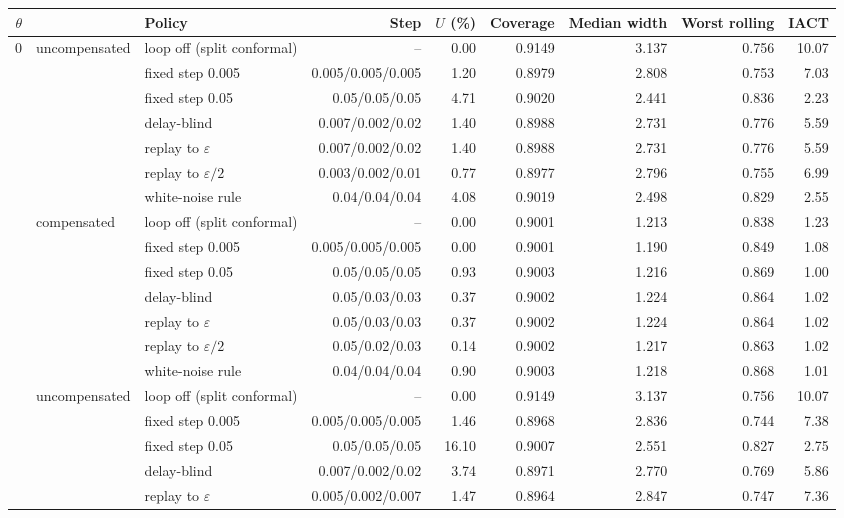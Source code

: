 \begin{tabular}{@{}rllrrrrrr@{}}
\toprule
$\theta$ & & Policy & Step & $U$ (\%) & Coverage & Median width & Worst rolling & IACT \\
\midrule
0 & uncompensated & loop off (split conformal) & -- & 0.00 & 0.9149 & 3.137 & 0.756 & 10.07 \\
 &  & fixed step 0.005 & 0.005/0.005/0.005 & 1.20 & 0.8979 & 2.808 & 0.753 & 7.03 \\
 &  & fixed step 0.05 & 0.05/0.05/0.05 & 4.71 & 0.9020 & 2.441 & 0.836 & 2.23 \\
 &  & delay-blind & 0.007/0.002/0.02 & 1.40 & 0.8988 & 2.731 & 0.776 & 5.59 \\
 &  & replay to $\varepsilon$ & 0.007/0.002/0.02 & 1.40 & 0.8988 & 2.731 & 0.776 & 5.59 \\
 &  & replay to $\varepsilon/2$ & 0.003/0.002/0.01 & 0.77 & 0.8977 & 2.796 & 0.755 & 6.99 \\
 &  & white-noise rule & 0.04/0.04/0.04 & 4.08 & 0.9019 & 2.498 & 0.829 & 2.55 \\
 & compensated & loop off (split conformal) & -- & 0.00 & 0.9001 & 1.213 & 0.838 & 1.23 \\
 &  & fixed step 0.005 & 0.005/0.005/0.005 & 0.00 & 0.9001 & 1.190 & 0.849 & 1.08 \\
 &  & fixed step 0.05 & 0.05/0.05/0.05 & 0.93 & 0.9003 & 1.216 & 0.869 & 1.00 \\
 &  & delay-blind & 0.05/0.03/0.03 & 0.37 & 0.9002 & 1.224 & 0.864 & 1.02 \\
 &  & replay to $\varepsilon$ & 0.05/0.03/0.03 & 0.37 & 0.9002 & 1.224 & 0.864 & 1.02 \\
 &  & replay to $\varepsilon/2$ & 0.05/0.02/0.03 & 0.14 & 0.9002 & 1.217 & 0.863 & 1.02 \\
 &  & white-noise rule & 0.04/0.04/0.04 & 0.90 & 0.9003 & 1.218 & 0.868 & 1.01 \\
\addlinespace
2 & uncompensated & loop off (split conformal) & -- & 0.00 & 0.9149 & 3.137 & 0.756 & 10.07 \\
 &  & fixed step 0.005 & 0.005/0.005/0.005 & 1.46 & 0.8968 & 2.836 & 0.744 & 7.38 \\
 &  & fixed step 0.05 & 0.05/0.05/0.05 & 16.10 & 0.9007 & 2.551 & 0.827 & 2.75 \\
 &  & delay-blind & 0.007/0.002/0.02 & 3.74 & 0.8971 & 2.770 & 0.769 & 5.86 \\
 &  & replay to $\varepsilon$ & 0.005/0.002/0.007 & 1.47 & 0.8964 & 2.847 & 0.747 & 7.36 \\

\end{tabular}
